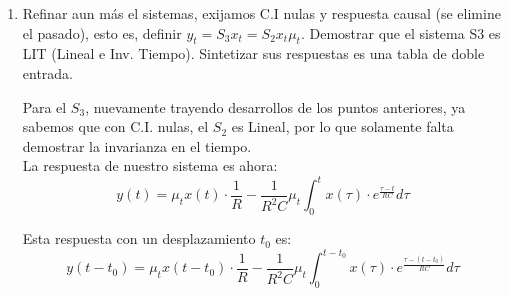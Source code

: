 \documentclass[12pt,a4paper]{report}
\begin{document}
\begin{enumerate}[label=\alph*)]

    \item Refinar aun más el sistemas, exijamos C.I nulas y respuesta causal (se elimine el pasado), esto es, definir
      $y_t = S_3{x_t} = S_2{x_t} \mu_t$. Demostrar que el sistema S3 es LIT (Lineal e Inv. Tiempo). Sintetizar sus
      respuestas es una tabla de doble entrada.

      Para el $S_3$, nuevamente trayendo desarrollos de los puntos anteriores, ya sabemos que con C.I. nulas, el $S_2$
      es Lineal, por lo que solamente falta demostrar la invarianza en el tiempo.\\

      La respuesta de nuestro sistema es ahora:
      $$y(t) =\mu_t x(t) \cdot \frac{1}{R}- \frac{1}{R^2C} \mu_t \int_{0}^{t} x(\tau) \cdot e^{\frac{\tau-t}{RC}} d\tau$$

      Esta respuesta con un desplazamiento $t_0$ es:
      $$y(t - t_0) =\mu_t x(t - t_0) \cdot \frac{1}{R}- \frac{1}{R^2C} \mu_t \int_{0}^{t - t_0} x(\tau) \cdot e^{\frac{\tau-(t - t_0)}{RC}} d\tau$$


\end{enumerate}
\end{document}
